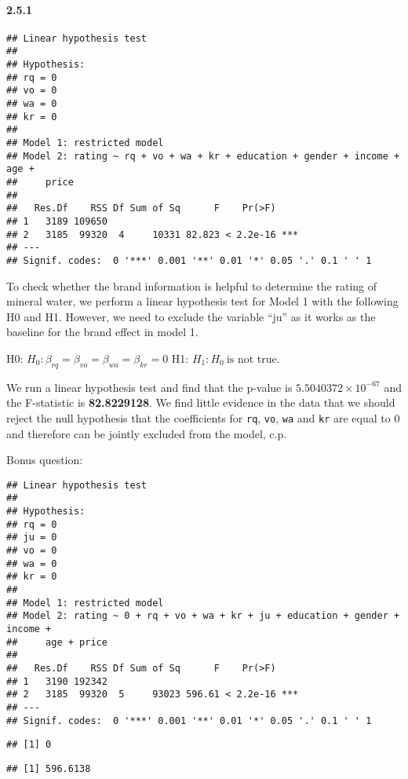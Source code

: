 \documentclass[
]{article}
\begin{document}
\hypertarget{section-4}{%
\paragraph{2.5.1}\label{section-4}}

\begin{verbatim}
## Linear hypothesis test
## 
## Hypothesis:
## rq = 0
## vo = 0
## wa = 0
## kr = 0
## 
## Model 1: restricted model
## Model 2: rating ~ rq + vo + wa + kr + education + gender + income + age + 
##     price
## 
##   Res.Df    RSS Df Sum of Sq      F    Pr(>F)    
## 1   3189 109650                                  
## 2   3185  99320  4     10331 82.823 < 2.2e-16 ***
## ---
## Signif. codes:  0 '***' 0.001 '**' 0.01 '*' 0.05 '.' 0.1 ' ' 1
\end{verbatim}

To check whether the brand information is helpful to determine the
rating of mineral water, we perform a linear hypothesis test for Model 1
with the following H0 and H1. However, we need to exclude the variable
``ju'' as it works as the baseline for the brand effect in model 1.

H0: \(H_0: \beta_{rq}=\beta_{vo}=\beta_{wa}=\beta_{kr}=0\) H1:
\(H_1: H_0\ \text{is not true.}\)

We run a linear hypothesis test and find that the p-value is
\textbf{\ensuremath{5.5040372\times 10^{-67}}} and the F-statistic is
\textbf{82.8229128}. We find little evidence in the data that we should
reject the null hypothesis that the coefficients for \texttt{rq},
\texttt{vo}, \texttt{wa} and \texttt{kr} are equal to 0 and therefore
can be jointly excluded from the model, c.p.

Bonus question:

\begin{verbatim}
## Linear hypothesis test
## 
## Hypothesis:
## rq = 0
## ju = 0
## vo = 0
## wa = 0
## kr = 0
## 
## Model 1: restricted model
## Model 2: rating ~ 0 + rq + vo + wa + kr + ju + education + gender + income + 
##     age + price
## 
##   Res.Df    RSS Df Sum of Sq      F    Pr(>F)    
## 1   3190 192342                                  
## 2   3185  99320  5     93023 596.61 < 2.2e-16 ***
## ---
## Signif. codes:  0 '***' 0.001 '**' 0.01 '*' 0.05 '.' 0.1 ' ' 1
\end{verbatim}

\begin{verbatim}
## [1] 0
\end{verbatim}

\begin{verbatim}
## [1] 596.6138
\end{verbatim}
\end{document}

